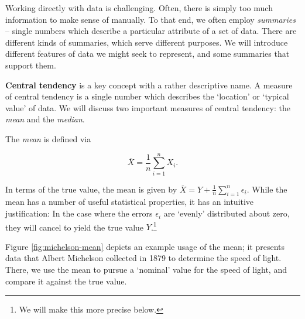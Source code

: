 \documentclass[../primer.tex]{subfiles}
\begin{document}
Working directly with data is challenging. Often, there is simply too much
information to make sense of manually. To that end, we often employ
\emph{summaries} -- single numbers which describe a particular attribute of a
set of data. There are different kinds of summaries, which serve different
purposes. We will introduce different features of data we might seek to
represent, and some summaries that support them.


\textbf{Central tendency} is a key concept with a rather descriptive name. A
measure of central tendency is a single number which describes the `location' or
`typical value' of data. We will discuss two important measures of central
tendency: the \emph{mean} and the \emph{median}.

The \emph{mean} is defined via

\begin{equation} \label{eq:def-sample-mean}
  \overline{X} = \frac{1}{n}\sum_{i=1}^n X_i.
\end{equation}

\noindent In terms of the true value, the mean is given by $\overline{X} = Y +
\frac{1}{n}\sum_{i=1}^n \epsilon_i$. While the mean has a number of useful
statistical properties, it has an intuitive justification: In the case where the
errors $\epsilon_i$ are `evenly' distributed about zero, they will cancel to
yield the true value $Y$.\footnote{We will make this more precise below.}

Figure \ref{fig:michelson-mean} depicts an example usage of the mean; it
presents data that Albert Michelson collected in 1879 to determine the speed of
light.\cite{dorsey1944velocity} There, we use the mean to pursue a `nominal'
value for the speed of light, and compare it against the true value.
\end{document}
